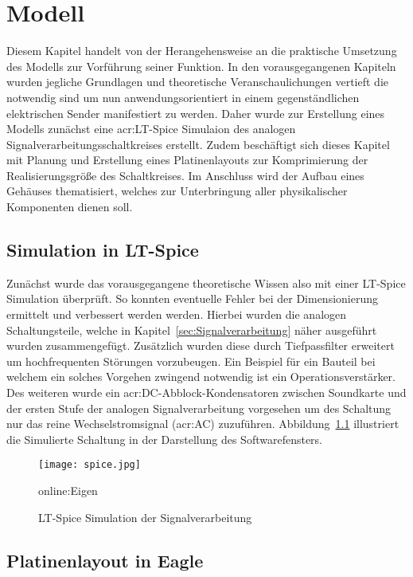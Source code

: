 
\chapter{Modell}
\label{sec:modell}
Diesem Kapitel handelt von der Herangehensweise an die praktische Umsetzung des Modells zur Vorführung seiner Funktion. In den vorausgegangenen Kapiteln wurden jegliche Grundlagen und theoretische Veranschaulichungen vertieft die notwendig sind um nun anwendungsorientiert in einem gegenständlichen elektrischen Sender manifestiert zu werden. Daher wurde zur Erstellung eines Modells zunächst eine \gls{acr:LT}-Spice Simulaion des analogen Signalverarbeitungsschaltkreises erstellt. Zudem beschäftigt sich dieses Kapitel mit Planung und Erstellung eines Platinenlayouts zur Komprimierung der Realisierungsgröße des Schaltkreises. Im Anschluss wird der Aufbau eines Gehäuses thematisiert, welches zur Unterbringung aller physikalischer Komponenten dienen soll.

\section{Simulation in LT-Spice}
\label{sec:simlt}

Zunächst wurde das vorausgegangene theoretische Wissen also mit einer LT-Spice Simulation überprüft. So konnten eventuelle Fehler bei der Dimensionierung ermittelt und verbessert werden werden. Hierbei wurden die analogen Schaltungsteile, welche in Kapitel~\ref{sec:Signalverarbeitung} näher ausgeführt wurden zusammengefügt. Zusätzlich wurden diese durch Tiefpassfilter erweitert um hochfrequenten Störungen vorzubeugen. Ein Beispiel für ein Bauteil bei welchem ein solches Vorgehen zwingend notwendig ist ein Operationsverstärker. Des weiteren wurde ein \gls{acr:DC}-Abblock-Kondensatoren zwischen Soundkarte und der ersten Stufe der analogen Signalverarbeitung vorgesehen um des Schaltung nur das reine Wechselstromsignal (\gls{acr:AC}) zuzuführen. Abbildung~\ref{fig:spice} illustriert die Simulierte Schaltung in der Darstellung des Softwarefensters.

\begin{figure}[H]
	\centering
	\texttt{[image: spice.jpg]}
	\caption[LT-Spice Simulation der Signalverarbeitung]{LT-Spice Simulation der Signalverarbeitung} \gls{online:Eigen}
	\label{fig:spice}
\end{figure}

\section{Platinenlayout in Eagle}
\label{sec:platineeagle}

